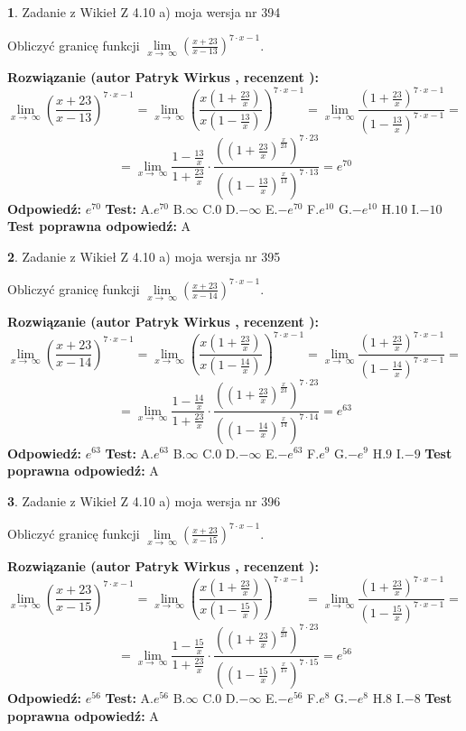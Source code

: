 \documentclass[12pt, a4paper]{article}
\theoremstyle{definition} %
\newtheorem{zad}{}
\newcommand{\zadStart}[1]{\begin{zad}#1\newline}
\newcommand{\zadStop}{\end{zad}}
\newcommand{\rozwStart}[2]{\noindent \textbf{Rozwiązanie (autor #1 , recenzent #2): }\newline}
\newcommand{\rozwStop}{\newline}
\newcommand{\odpStart}{\noindent \textbf{Odpowiedź:}\newline}
\newcommand{\odpStop}{\newline}
\newcommand{\testStart}{\noindent \textbf{Test:}\newline}
\newcommand{\testStop}{\newline}
\newcommand{\kluczStart}{\noindent \textbf{Test poprawna odpowiedź:}\newline}
\newcommand{\kluczStop}{\newline}
\begin{document}
\zadStart{Zadanie z Wikieł Z 4.10 a) moja wersja nr 394}

Obliczyć granicę funkcji  $\lim\limits_{x\to\ \infty}(\frac{x+23}{x-13})^{7\cdot x-1}$.
\zadStop
\rozwStart{Patryk Wirkus}{}
$$\lim\limits_{x\to\ \infty}(\frac{x+23}{x-13})^{7\cdot x-1} = \lim\limits_{x\to\ \infty}(\frac{x(1+\frac{23}{x})}{x(1-\frac{13}{x})})^{7\cdot x-1}=\lim\limits_{x\to\ \infty}\frac{(1+\frac{23}{x})^{7\cdot x-1}}{(1-\frac{13}{x})^{7\cdot x-1}}=$$
$$=\lim\limits_{x\to\ \infty}\frac{1-\frac{13}{x}}{1+\frac{23}{x}}\cdot\frac{((1+\frac{23}{x})^{\frac{x}{23}})^{7\cdot23}}{((1-\frac{13}{x})^{\frac{x}{13}})^{7\cdot13}}=e^{70}$$
\rozwStop
\odpStart
$e^{70}$
\odpStop
\testStart
A.$e^{70}$ B.$\infty$ C.$0$ D.$-\infty$ E.$-e^{70}$
F.$e^{10}$ G.$-e^{10}$
H.$10$
I.$-10$
\testStop
\kluczStart
A
\kluczStop



\zadStart{Zadanie z Wikieł Z 4.10 a) moja wersja nr 395}

Obliczyć granicę funkcji  $\lim\limits_{x\to\ \infty}(\frac{x+23}{x-14})^{7\cdot x-1}$.
\zadStop
\rozwStart{Patryk Wirkus}{}
$$\lim\limits_{x\to\ \infty}(\frac{x+23}{x-14})^{7\cdot x-1} = \lim\limits_{x\to\ \infty}(\frac{x(1+\frac{23}{x})}{x(1-\frac{14}{x})})^{7\cdot x-1}=\lim\limits_{x\to\ \infty}\frac{(1+\frac{23}{x})^{7\cdot x-1}}{(1-\frac{14}{x})^{7\cdot x-1}}=$$
$$=\lim\limits_{x\to\ \infty}\frac{1-\frac{14}{x}}{1+\frac{23}{x}}\cdot\frac{((1+\frac{23}{x})^{\frac{x}{23}})^{7\cdot23}}{((1-\frac{14}{x})^{\frac{x}{14}})^{7\cdot14}}=e^{63}$$
\rozwStop
\odpStart
$e^{63}$
\odpStop
\testStart
A.$e^{63}$ B.$\infty$ C.$0$ D.$-\infty$ E.$-e^{63}$
F.$e^{9}$ G.$-e^{9}$
H.$9$
I.$-9$
\testStop
\kluczStart
A
\kluczStop



\zadStart{Zadanie z Wikieł Z 4.10 a) moja wersja nr 396}

Obliczyć granicę funkcji  $\lim\limits_{x\to\ \infty}(\frac{x+23}{x-15})^{7\cdot x-1}$.
\zadStop
\rozwStart{Patryk Wirkus}{}
$$\lim\limits_{x\to\ \infty}(\frac{x+23}{x-15})^{7\cdot x-1} = \lim\limits_{x\to\ \infty}(\frac{x(1+\frac{23}{x})}{x(1-\frac{15}{x})})^{7\cdot x-1}=\lim\limits_{x\to\ \infty}\frac{(1+\frac{23}{x})^{7\cdot x-1}}{(1-\frac{15}{x})^{7\cdot x-1}}=$$
$$=\lim\limits_{x\to\ \infty}\frac{1-\frac{15}{x}}{1+\frac{23}{x}}\cdot\frac{((1+\frac{23}{x})^{\frac{x}{23}})^{7\cdot23}}{((1-\frac{15}{x})^{\frac{x}{15}})^{7\cdot15}}=e^{56}$$
\rozwStop
\odpStart
$e^{56}$
\odpStop
\testStart
A.$e^{56}$ B.$\infty$ C.$0$ D.$-\infty$ E.$-e^{56}$
F.$e^{8}$ G.$-e^{8}$
H.$8$
I.$-8$
\testStop
\kluczStart
A
\kluczStop
\end{document}
